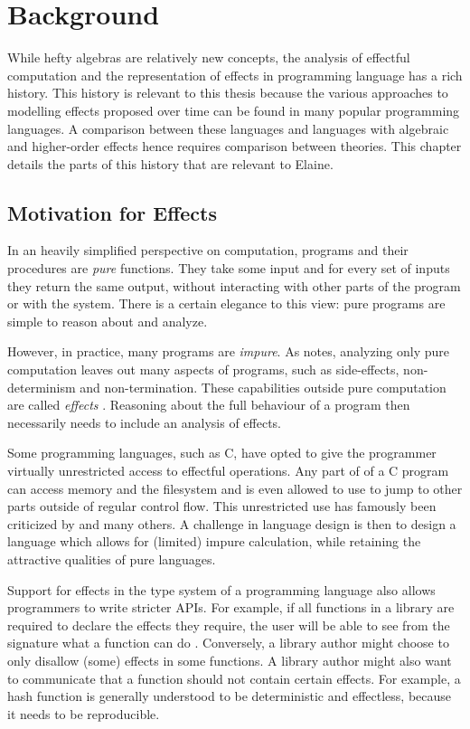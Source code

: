 \chapter{Background}\label{chap:background}

While hefty algebras are relatively new concepts, the analysis of effectful computation and the representation of effects in programming language has a rich history. This history is relevant to this thesis because the various approaches to modelling effects proposed over time can be found in many popular programming languages. A comparison between these languages and languages with algebraic and higher-order effects hence requires comparison between theories. This chapter details the parts of this history that are relevant to Elaine.

\section{Motivation for Effects}

In an heavily simplified perspective on computation, programs and their procedures are \emph{pure} functions. They take some input and for every set of inputs they return the same output, without interacting with other parts of the program or with the system. There is a certain elegance to this view: pure programs are simple to reason about and analyze.

However, in practice, many programs are \emph{impure}. As \textcite{moggi_computational_1989} notes, analyzing only pure computation leaves out many aspects of programs, such as side-effects, non-determinism and non-termination. These capabilities outside pure computation are called \emph{effects} \autocite{moggi_computational_1989}. Reasoning about the full behaviour of a program then necessarily needs to include an analysis of effects.

Some programming languages, such as C, have opted to give the programmer virtually unrestricted access to effectful operations. Any part of of a C program can access memory and the filesystem and is even allowed to use  to jump to other parts outside of regular control flow. This unrestricted use has famously been criticized by \textcite{dijkstra_letters_1968} and many others. A challenge in language design is then to design a language which allows for (limited) impure calculation, while retaining the attractive qualities of pure languages.

Support for effects in the type system of a programming language also allows programmers to write stricter APIs. For example, if all functions in a library are required to declare the effects they require, the user will be able to see from the signature what a function can do \autocite{brachthauser_effects_2020}. Conversely, a library author might choose to only disallow (some) effects in some functions. A library author might also want to communicate that a function should not contain certain effects. For example, a hash function is generally understood to be deterministic and effectless, because it needs to be reproducible.

